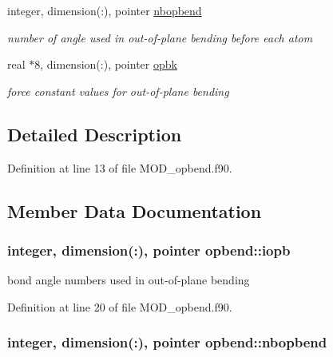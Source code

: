 \begin{DoxyCompactItemize}
integer, dimension(\-:), pointer \hyperlink{classopbend_acb5a4c212f53aed7990b898946f0dc2c}{nbopbend}
\begin{DoxyCompactList}\small\item\em number of angle used in out-\/of-\/plane bending before each atom \end{DoxyCompactList}\item 
real $\ast$8, dimension(\-:), pointer \hyperlink{classopbend_a213b344234ce31a51b65aa619612a1ad}{opbk}
\begin{DoxyCompactList}\small\item\em force constant values for out-\/of-\/plane bending \end{DoxyCompactList}\end{DoxyCompactItemize}


\subsection{Detailed Description}


Definition at line 13 of file M\-O\-D\-\_\-opbend.\-f90.



\subsection{Member Data Documentation}
\hypertarget{classopbend_a37701e35e72211c5764cf3445f159a8f}{
\subsubsection[{iopb}]{\setlength{\rightskip}{0pt plus 5cm}integer, dimension(\-:), pointer opbend\-::iopb}}\label{classopbend_a37701e35e72211c5764cf3445f159a8f}


bond angle numbers used in out-\/of-\/plane bending 



Definition at line 20 of file M\-O\-D\-\_\-opbend.\-f90.

\hypertarget{classopbend_acb5a4c212f53aed7990b898946f0dc2c}{
\subsubsection[{nbopbend}]{\setlength{\rightskip}{0pt plus 5cm}integer, dimension(\-:), pointer opbend\-::nbopbend}}\label{classopbend_acb5a4c212f53aed7990b898946f0dc2c}


